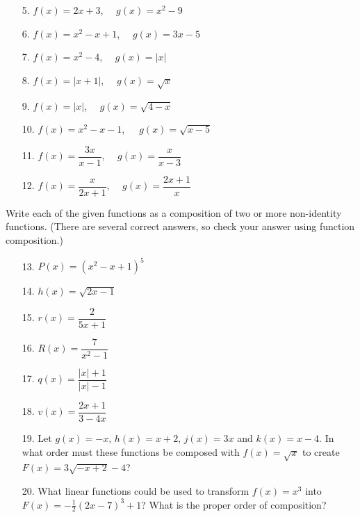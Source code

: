 \documentclass[12pt]{article}
\theoremstyle{definition}
\begin{document}
\begin{multicols}{2}
\begin{enumerate}
\item[5.]  $f(x) = 2x+3$, \ \ $g(x) = x^2-9$\\
\item[6.]  $f(x) = x^2 -x+1$, \ \ $g(x) = 3x-5$\\ 
\item[7.]  $f(x) = x^2-4$, \ \ $g(x) = |x|$\\
\item[8.]  $f(x) = |x+1|$, \ \ $g(x) = \sqrt{x}$\\
\item[9.]  $f(x) = |x|$, \ \ $g(x) = \sqrt{4-x}$\\
\item[10.]  \mbox{$f(x) = x^2-x-1$, \ \ $g(x) = \sqrt{x-5}$}\\ 
\item[11.]  $f(x) = \dfrac{3x}{x-1}$, \ \ $g(x) =\dfrac{x}{x-3}$\\
\item[12.]  $f(x) = \dfrac{x}{2x+1}$, \ \ $g(x) = \dfrac{2x+1}{x}$\\
\end{enumerate}
\end{multicols}

Write each of the given functions as a composition of two or more non-identity functions.  (There are several correct answers, so check your answer using function composition.)

\begin{multicols}{3}
\begin{enumerate}
\item[13.]  $P(x) = \left(x^2-x+1\right)^5$\\
\item[14.]  $h(x) = \sqrt{2x-1}$\\
\item[15.]  $r(x) = \dfrac{2}{5x+1}$\\
\item[16.]  $R(x) = \dfrac{7}{x^2-1}$\\
\item[17.]  $q(x) = \dfrac{|x|+1}{|x|-1}$\\
\item[18.]  $v(x) = \dfrac{2x+1}{3-4x}$\\
\end{enumerate}
\end{multicols}

\begin{enumerate}
\item[19.] Let $g(x) = -x, \, h(x) = x + 2, \, j(x) = 3x$ and $k(x) = x - 4$.  In what order must these functions be composed with $f(x) = \sqrt{x}$ to create $F(x) = 3\sqrt{-x + 2} - 4$?

\item[20.] What linear functions could be used to transform $f(x) = x^{3}$ into \mbox{$F(x) = -\frac{1}{2}(2x - 7)^{3} + 1$}?  What is the proper order of composition?
\end{enumerate}
\end{document}
